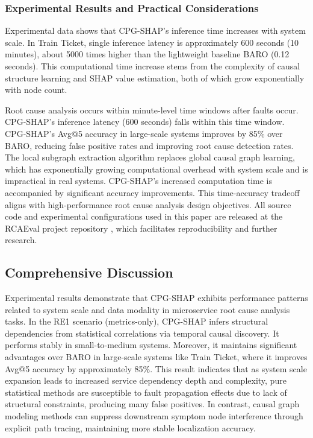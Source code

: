 \documentclass[conference]{IEEEtran}
\begin{document}
\subsubsection{Experimental Results and Practical Considerations}

Experimental data shows that CPG-SHAP's inference time increases with system scale. In Train Ticket, single inference latency is approximately 600 seconds (10 minutes), about 5000 times higher than the lightweight baseline BARO (0.12 seconds). This computational time increase stems from the complexity of causal structure learning and SHAP value estimation, both of which grow exponentially with node count.

Root cause analysis occurs within minute-level time windows after faults occur. CPG-SHAP's inference latency (600 seconds) falls within this time window. CPG-SHAP's Avg@5 accuracy in large-scale systems improves by 85\% over BARO, reducing false positive rates and improving root cause detection rates. The local subgraph extraction algorithm replaces global causal graph learning, which has exponentially growing computational overhead with system scale and is impractical in real systems. CPG-SHAP's increased computation time is accompanied by significant accuracy improvements. This time-accuracy tradeoff aligns with high-performance root cause analysis design objectives. All source code and experimental configurations used in this paper are released at the RCAEval project repository \cite{rcaevalrepo}, which facilitates reproducibility and further research.

\subsection{Comprehensive Discussion}

Experimental results demonstrate that CPG-SHAP exhibits performance patterns related to system scale and data modality in microservice root cause analysis tasks. In the RE1 scenario (metrics-only), CPG-SHAP infers structural dependencies from statistical correlations via temporal causal discovery. It performs stably in small-to-medium systems. Moreover, it maintains significant advantages over BARO in large-scale systems like Train Ticket, where it improves Avg@5 accuracy by approximately 85\%. This result indicates that as system scale expansion leads to increased service dependency depth and complexity, pure statistical methods are susceptible to fault propagation effects due to lack of structural constraints, producing many false positives. In contrast, causal graph modeling methods can suppress downstream symptom node interference through explicit path tracing, maintaining more stable localization accuracy.
\end{document}
